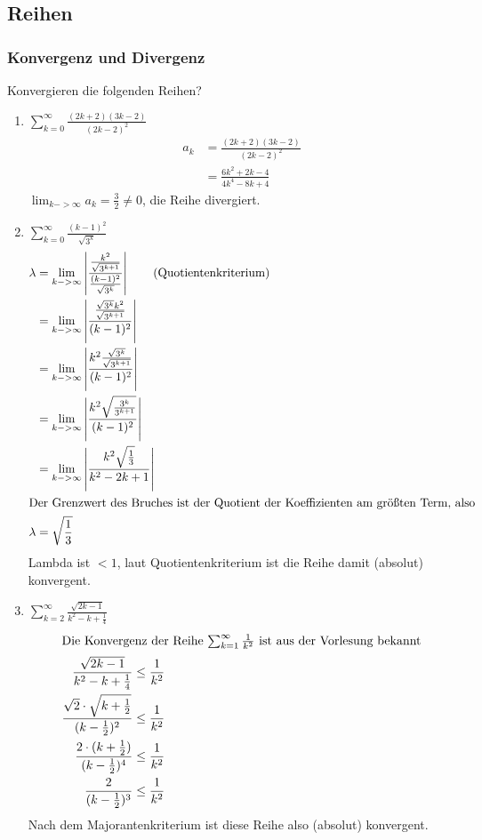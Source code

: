 \documentclass[11pt, a4paper]{article}
\newcommand{\abs}[1]{\left\lvert#1\right\rvert}
\begin{document}
\subsection{Reihen}
\subsubsection{Konvergenz und Divergenz}
Konvergieren die folgenden Reihen?
\begin{enumerate}
	\item $\sum_{k=0}^\infty \frac{(2k+2)(3k-2)}{(2k-2)^2}$
		\begin{align*}
			a_k &= \frac{(2k+2)(3k-2)}{(2k-2)^2} \\
			&= \frac{6k^2+2k-4}{4k^4-8k+4}
		\end{align*}
		$\lim_{k->\infty} a_k = \frac{3}{2} \neq 0$, die Reihe divergiert.
	\item $\sum_{k=0}^\infty \frac{(k-1)^2}{\sqrt{3^k}}$
		\begin{align*}
			\lambda &= \lim_{k->\infty} \abs{ \frac{\frac{k^2}{\sqrt{3^{k+1}}}}{\frac{(k-1)^2}{\sqrt{3^k}}} } \tag{Quotientenkriterium} \\
			&= \lim_{k->\infty} \abs{ \frac{\frac{\sqrt{3^k} k^2}{\sqrt{3^{k+1}}}}{(k-1)^2} } \\
			&= \lim_{k->\infty} \abs{ \frac{k^2 \frac{\sqrt{3^k}}{\sqrt{3^{k+1}}}}{(k-1)^2} } \\
			&= \lim_{k->\infty} \abs{ \frac{k^2 \sqrt{\frac{3^k}{3^{k+1}}}}{(k-1)^2} } \\
			&= \lim_{k->\infty} \abs{ \frac{k^2 \sqrt{\frac{1}{3}}}{k^2-2k+1} } \\
			\intertext{Der Grenzwert des Bruches ist der Quotient der Koeffizienten am größten Term, also}
			\lambda &= \sqrt{\frac{1}{3}}
		\end{align*}
		Lambda ist $<1$, laut Quotientenkriterium ist die Reihe damit (absolut) konvergent.
	\item $\sum_{k=2}^\infty \frac{\sqrt{2k-1}}{k^2-k+\frac{1}{4}}$
		\begin{align*}
			\shortintertext{Die Konvergenz der Reihe $\sum_{k=1}^\infty \frac{1}{k^2}$ ist aus der Vorlesung bekannt}
			\frac{\sqrt{2k-1}}{k^2-k+\frac{1}{4}} &\leq \frac{1}{k^2} \\
			\frac{\sqrt{2} \cdot \sqrt{k+\frac{1}{2}}}{(k-\frac{1}{2})^2} &\leq \frac{1}{k^2} \\
			\frac{2 \cdot (k+\frac{1}{2})}{(k-\frac{1}{2})^4} &\leq \frac{1}{k^2} \\
			\frac{2}{(k-\frac{1}{2})^3} &\leq \frac{1}{k^2}
		\end{align*}
		Nach dem Majorantenkriterium ist diese Reihe also (absolut) konvergent.
\end{enumerate}
\end{document}
